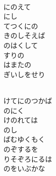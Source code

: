 \documentclass[10pt,b5j]{tarticle} %
\begin{document}
\vspace{1.5em} %
\newcommand{\linespace}{0.5em} %
\newcommand{\blocksize}{0.5\hsize} %
\newcommand{\itemmargin}{3em} %
\begin{enumerate} %
    \setlength{\itemindent}{\itemmargin} %
    \begin{minipage}[c]{\blocksize}
    
        \vspace{\linespace}
        \item~\\
        にのえて\\
        にし\\
        てつくにの\\
        きのしそえば\\
        のはくして\\
        すりの\\
        はまたの\\
        ぎいしをせり
        
    \end{minipage}
    \begin{minipage}[c]{\blocksize}
        
        \vspace{\linespace}
        \item~\\
        けてにのつかば\\
        のにく\\
        けのれては\\
        のし\\
        ばむゆくもく\\
        のぞするを\\
        りそぞろにるは\\
        のをいぶかな
        

\end{minipage}
\end{enumerate}
\end{document}
